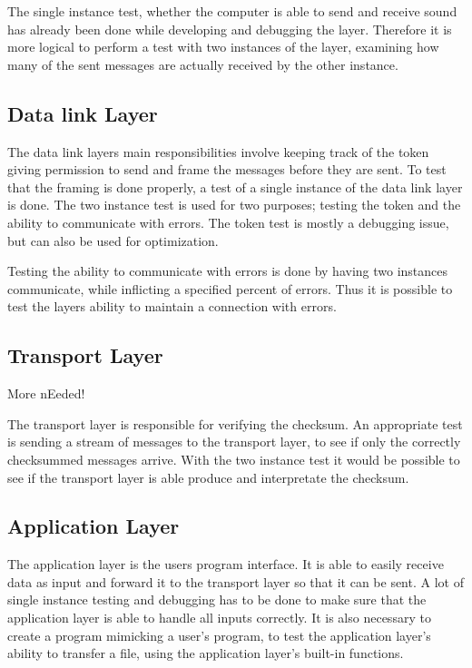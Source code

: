The single instance test, whether the computer is able to send and receive sound has already been done while developing and debugging the layer. Therefore it is more logical to perform a test with two instances of the layer, examining how many of the sent messages are actually received by the other instance.

\subsection{Data link Layer}


The data link layers main responsibilities involve keeping track of the token giving permission to send and frame the messages before they are sent. To test that the framing is done properly, a test of a single instance of the data link layer is done. The two instance test is used for two purposes; testing the token and the ability to communicate with errors. The token test is mostly a debugging issue, but can also be used for optimization.

Testing the ability to communicate with errors is done by having two instances communicate, while inflicting a specified percent of errors. Thus it is possible to test the layers ability to maintain a connection with errors.


\subsection{Transport Layer}

More nEeded!

The transport layer is responsible for verifying the checksum. An appropriate test is sending a stream of messages to the transport layer, to see if only the correctly checksummed messages arrive. With the two instance test it would be possible to see if the transport layer is able produce and interpretate the checksum.

\subsection{Application Layer}

The application layer is the users program interface. It is able to easily receive data as input and forward it to the transport layer so that it can be sent. A lot of single instance testing and debugging has to be done to make sure that the application layer is able to handle all inputs correctly. It is also necessary to create a program mimicking a user's program, to test the application layer's ability to transfer a file, using the application layer's built-in functions. 

